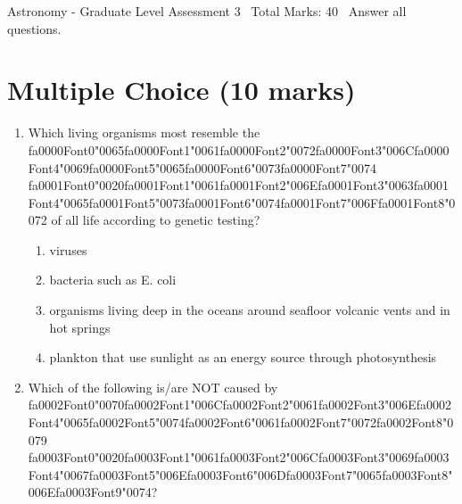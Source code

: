 \documentclass[12pt]{article}
\begin{document}
\begin{center}
Astronomy - Graduate Level Assessment 3 \
Total Marks: 40 \
Answer all questions.
\end{center}

\section*{Multiple Choice (10 marks)}
\begin{enumerate}[label=\arabic*.]
\item Which living organisms most resemble the {\csname fa0000Font0\endcsname\char"0065}{\csname fa0000Font1\endcsname\char"0061}{\csname fa0000Font2\endcsname\char"0072}{\csname fa0000Font3\endcsname\char"006C}{\csname fa0000Font4\endcsname\char"0069}{\csname fa0000Font5\endcsname\char"0065}{\csname fa0000Font6\endcsname\char"0073}{\csname fa0000Font7\endcsname\char"0074} {\csname fa0001Font0\endcsname\char"0020}{\csname fa0001Font1\endcsname\char"0061}{\csname fa0001Font2\endcsname\char"006E}{\csname fa0001Font3\endcsname\char"0063}{\csname fa0001Font4\endcsname\char"0065}{\csname fa0001Font5\endcsname\char"0073}{\csname fa0001Font6\endcsname\char"0074}{\csname fa0001Font7\endcsname\char"006F}{\csname fa0001Font8\endcsname\char"0072} of all life according to genetic
testing?
\begin{enumerate}[label=(\alph*)]
    \item viruses
    \item bacteria such as E. coli
    \item organisms living deep in the oceans around seafloor volcanic vents and in hot springs
    \item plankton that use sunlight as an energy source through photosynthesis
\end{enumerate}
\item Which of the following is/are NOT caused by {\csname fa0002Font0\endcsname\char"0070}{\csname fa0002Font1\endcsname\char"006C}{\csname fa0002Font2\endcsname\char"0061}{\csname fa0002Font3\endcsname\char"006E}{\csname fa0002Font4\endcsname\char"0065}{\csname fa0002Font5\endcsname\char"0074}{\csname fa0002Font6\endcsname\char"0061}{\csname fa0002Font7\endcsname\char"0072}{\csname fa0002Font8\endcsname\char"0079} {\csname fa0003Font0\endcsname\char"0020}{\csname fa0003Font1\endcsname\char"0061}{\csname fa0003Font2\endcsname\char"006C}{\csname fa0003Font3\endcsname\char"0069}{\csname fa0003Font4\endcsname\char"0067}{\csname fa0003Font5\endcsname\char"006E}{\csname fa0003Font6\endcsname\char"006D}{\csname fa0003Font7\endcsname\char"0065}{\csname fa0003Font8\endcsname\char"006E}{\csname fa0003Font9\endcsname\char"0074}?

\end{enumerate}
\end{document}
